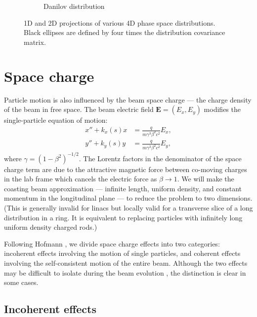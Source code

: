 \begin{figure}[!p]
\begin{subfigure}{0.49\textwidth}
        \caption{Danilov distribution}
        \label{fig:distributions_danilov}
    \end{subfigure}
    \caption{1D and 2D projections of various 4D phase space distributions. Black ellipses are defined by four times the distribution covariance matrix.}
    \label{fig:distributions}
\end{figure}
%





\section{Space charge}\label{sec:Space charge}

Particle motion is also influenced by the beam space charge — the charge density of the beam in free space. The beam electric field $\mathbf{E} = (E_x, E_y)$ modifies the single-particle equation of motion:
%
\begin{equation} \label{eq:eom_with_spacecharge}
\begin{aligned}
    x'' + k_x(s)x &= \frac{q}{m \gamma^3 \beta^2 c^2} E_x, \\
    y'' + k_y(s)y &= \frac{q}{m \gamma^3 \beta^2 c^2} E_y,
\end{aligned}
\end{equation}
%
where $\gamma = \left( 1 - \beta^2 \right)^{-1/2}$. The Lorentz factors in the denominator of the space charge term are due to the attractive magnetic force between co-moving charges in the lab frame which cancels the electric force as $\beta \rightarrow 1$. We will make the coasting beam approximation — infinite length, uniform density, and constant momentum in the longitudinal plane — to reduce the problem to two dimensions. (This is generally invalid for linacs but locally valid for a transverse slice of a long distribution in a ring. It is equivalent to replacing particles with infinitely long uniform density charged rods.) 

Following Hofmann \cite{Hofmann2017Book}, we divide space charge effects into two categories: incoherent effects involving the motion of single particles, and coherent effects involving the self-consistent motion of the entire beam. Although the two effects may be difficult to isolate during the beam evolution \cite{Hofmann2021}, the distinction is clear in some cases. 


\subsection{Incoherent effects}

